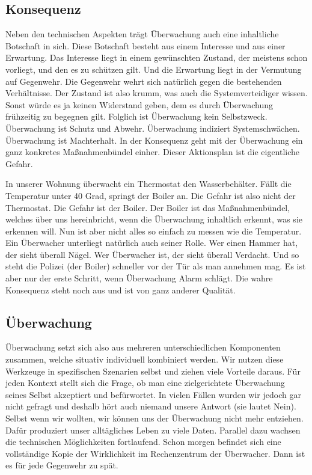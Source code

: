 	\subsection{Konsequenz}
	Neben den technischen Aspekten trägt Überwachung auch eine inhaltliche Botschaft in sich. Diese Botschaft besteht aus einem Interesse und aus einer Erwartung. Das Interesse liegt in einem gewünschten Zustand, der meistens schon vorliegt, und den es zu schützen gilt. Und die Erwartung liegt in der Vermutung auf Gegenwehr. Die Gegenwehr wehrt sich natürlich gegen die bestehenden Verhältnisse. Der Zustand ist also krumm, was auch die Systemverteidiger wissen. Sonst würde es ja keinen Widerstand geben, dem es durch Überwachung frühzeitig zu begegnen gilt. Folglich ist Überwachung kein Selbstzweck. Überwachung ist Schutz und Abwehr. Überwachung indiziert Systemschwächen. Überwachung ist Machterhalt. In der Konsequenz geht mit der Überwachung ein ganz konkretes Maßnahmenbündel einher. Dieser Aktionsplan ist die eigentliche Gefahr.
	
	In unserer Wohnung überwacht ein Thermostat den Wasserbehälter. Fällt die Temperatur unter 40 Grad, springt der Boiler an. Die Gefahr ist also nicht der Thermostat. Die Gefahr ist der Boiler. Der Boiler ist das Maßnahmenbündel, welches über uns hereinbricht, wenn die Überwachung inhaltlich erkennt, was sie erkennen will. Nun ist aber nicht alles so einfach zu messen wie die Temperatur. Ein Überwacher unterliegt natürlich auch seiner Rolle. Wer einen Hammer hat, der sieht überall Nägel. Wer Überwacher ist, der sieht überall Verdacht. Und so steht die Polizei (der Boiler) schneller vor der Tür als man annehmen mag. Es ist aber nur der erste Schritt, wenn Überwachung Alarm schlägt. Die wahre Konsequenz steht noch aus und ist von ganz anderer Qualität.
	
	\subsection{Überwachung}
	Überwachung setzt sich also aus mehreren unterschiedlichen Komponenten zusammen, welche situativ individuell kombiniert werden. Wir nutzen diese Werkzeuge in spezifischen Szenarien selbst und ziehen viele Vorteile daraus. Für jeden Kontext stellt sich die Frage, ob man eine zielgerichtete Überwachung seines Selbst akzeptiert und befürwortet. In vielen Fällen wurden wir jedoch gar nicht gefragt und deshalb hört auch niemand unsere Antwort (sie lautet Nein). Selbst wenn wir wollten, wir können uns der Überwachung nicht mehr entziehen. Dafür produziert unser alltägliches Leben zu viele Daten. Parallel dazu wachsen die technischen Möglichkeiten fortlaufend. Schon morgen befindet sich eine vollständige Kopie der Wirklichkeit im Rechenzentrum der Überwacher. Dann ist es für jede Gegenwehr zu spät.
	
